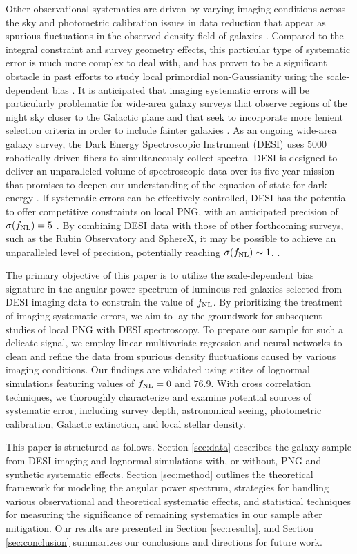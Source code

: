 Other observational systematics are driven by varying imaging conditions across the sky \citep{ross2011} and photometric calibration issues in data reduction that appear as spurious fluctuations in the observed density field of galaxies \citep{huterer2013calibration}. Compared to the integral constraint and survey geometry effects, this particular type of systematic error is much more complex to deal with, and has proven to be a significant obstacle in past efforts to study local primordial non-Gaussianity using the scale-dependent bias \citep[see, e.g.,][]{pullen2013systematic, Ho2015JCAP...05..040H}. It is anticipated that imaging systematic errors will be particularly problematic for wide-area galaxy surveys that observe regions of the night sky closer to the Galactic plane and that seek to incorporate more lenient selection criteria in order to include fainter galaxies \citep[see, e.g,][]{kitanidis2020imaging}. As an ongoing wide-area galaxy survey, the Dark Energy Spectroscopic Instrument (DESI) uses $5000$ robotically-driven fibers to simultaneously collect spectra. DESI is designed to deliver an unparalleled volume of spectroscopic data over its five year mission that promises to deepen our understanding of the equation of state for dark energy \citep{aghamousa2016desi}. If systematic errors can be effectively controlled, DESI has the potential to offer competitive constraints on local PNG, with an anticipated precision of $\sigma(f_{\rm NL})=5$ \citep{aghamousa2016desi}. By combining DESI data with those of other forthcoming surveys, such as the Rubin Observatory and SphereX, it may be possible to achieve an unparalleled level of precision, potentially reaching $\sigma (f_{\rm NL}) \sim 1$. \citep[see, e.g.,][]{Heinrich2022AAS...24020203H}.
 
The primary objective of this paper is to utilize the scale-dependent bias signature in the angular power spectrum of luminous red galaxies selected from DESI imaging data to constrain the value of $f_{\rm NL}$. By prioritizing the treatment of imaging systematic errors, we aim to lay the groundwork for subsequent studies of local PNG with DESI spectroscopy. To prepare our sample for such a delicate signal, we employ linear multivariate regression and neural networks to clean and refine the data from spurious density fluctuations caused by various imaging conditions. Our findings are validated using suites of lognormal simulations featuring values of $f_{\rm NL}=0$ and $76.9$. With cross correlation techniques, we thoroughly characterize and examine potential sources of systematic error, including survey depth, astronomical seeing, photometric calibration, Galactic extinction, and local stellar density.

This paper is structured as follows. Section \ref{sec:data} describes the galaxy sample from DESI imaging and lognormal simulations with, or without, PNG and synthetic systematic effects. Section \ref{sec:method} outlines the theoretical framework for modeling the angular power spectrum, strategies for handling various observational and theoretical systematic effects, and statistical techniques for measuring the significance of remaining systematics in our sample after mitigation. Our results are presented in Section \ref{sec:results}, and Section \ref{sec:conclusion} summarizes our conclusions and directions for future work.